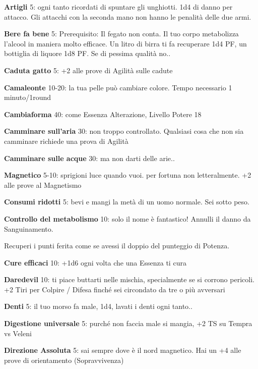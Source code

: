 \documentclass[a4paper,11pt,twoside,openany]{book}
\begin{document}
\textbf{Artigli} 5: ogni tanto ricordati di spuntare gli unghiotti. 1d4 di danno per attacco. Gli attacchi con la seconda mano non hanno le penalità delle due armi.

\textbf{Bere fa bene} 5: Prerequisito: Il fegato non conta. Il tuo corpo metabolizza l'alcool in maniera molto efficace. Un litro di birra ti fa recuperare 1d4 PF, un bottiglia di liquore 1d8 PF. Se di pessima qualità no..

\textbf{Caduta gatto} 5: +2 alle prove di Agilità sulle cadute

\textbf{Camaleonte} 10-20: la tua pelle può cambiare colore. Tempo necessario 1 minuto/1round

\textbf{Cambiaforma} 40: come Essenza Alterazione, Livello Potere 18

\textbf{Camminare sull'aria} 30: non troppo controllato. Qualsiasi cosa che non sia camminare richiede una prova di Agilità

\textbf{Camminare sulle acque}  30: ma non darti delle arie..

\textbf{Magnetico} 5-10: sprigioni luce quando vuoi. per fortuna non letteralmente. +2 alle prove al Magnetismo

\textbf{Consumi ridotti} 5: bevi e mangi la metà di un uomo normale. Sei sotto peso.

\textbf{Controllo del metabolismo}  10: solo il nome è fantastico! Annulli il danno da Sanguinamento.

Recuperi i punti ferita come se avessi il doppio del punteggio di Potenza.

\textbf{Cure efficaci} 10: +1d6 ogni volta che una Essenza
ti cura

\textbf{Daredevil} 10: ti piace buttarti nelle mischia, specialmente se si corrono pericoli. +2 Tiri per Colpire / Difesa finché sei circondato da tre o più avversari

\textbf{Denti} 5: il tuo morso fa male, 1d4, lavati i denti ogni tanto..

\textbf{Digestione universale} 5: purché non faccia male si mangia, +2 TS su Tempra vs Veleni

\textbf{Direzione Assoluta} 5: sai sempre dove è il nord magnetico. Hai un +4 alle prove di orientamento (Sopravvivenza)
\end{document}
